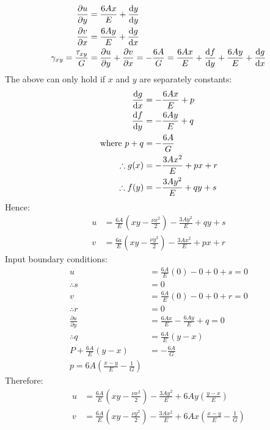 \documentclass[11pt]{article}
\numberwithin{equation}{section}
\begin{document}
\begin{align}
    \frac{\partial u }{\partial y}    & = \frac{6Ax}{E} + \frac{\dif y }{\dif y}                                                                                                                      \\
    \frac{\partial v}{\partial x}     & = \frac{6Ay}{E} + \frac{\dif g}{\dif x}                                                                                                                       \\
    \gamma_{xy} = \frac{\tau_{xy}}{G} & = \frac{\partial u}{\partial y} + \frac{\partial v}{\partial x} = -\frac{6A}{G}= \frac{6Ax}{E} + \frac{\dif f}{\dif y} + \frac{6Ay}{E}+ \frac{\dif g}{\dif x}
\end{align}
The above can only hold if $x$ and $y$ are separately constants:
\begin{align}
    \frac{\dif g}{\dif x} & = -\frac{6Ax}{E} + p        \\
    \frac{\dif f}{\dif y} & = -\frac{6Ay}{E} + q        \\
    \textrm{where } p+q   & = -\frac{6A}{G}             \\
    \therefore g(x)       & = -\frac{3Ax^2}{E} + px + r \\
    \therefore f(y)       & = -\frac{3Ay^2}{E} + qy + s
\end{align}
Hence:
\begin{align}
    u & = \frac{6A}{E}\left(xy - \frac{\nu x^2}{2}\right)-\frac{3Ay^2}{E} + qy +s  \\
    v & = \frac{6a}{E}\left(xy - \frac{\nu y^2}{2}\right)-\frac{3Ax^2}{E} + px + r
\end{align}
Input boundary conditions:
\begin{align}
    u                                  & = \frac{6A}{E} \left(0\right) - 0 + 0+ s= 0 \\
    \therefore s                       & = 0                                         \\
    v                                  & = \frac{6A}{E} \left(0\right) - 0 + 0+ r= 0 \\
    \therefore r                       & = 0                                         \\
    \frac{\partial u}{\partial y}      & = \frac{6Ax}{E} - \frac{6Ay}{E} + q = 0     \\
    \therefore q                       & = \frac{6A}{E}\left(y - x\right)            \\
    P + \frac{6A}{E}\left(y - x\right) & = - \frac{6A}{G}                            \\
    p = 6A\left(\frac{x-y}{E}-\frac{1}{G}\right)
\end{align}
Therefore:
\begin{align}
    u & = \frac{6A}{E}\left(xy-\frac{\nu x^2}{2}\right) - \frac{3Ay^2}{E} + 6Ay\left(\frac{y-x}{E}\right)             \\
    v & = \frac{6A}{E}\left(xy-\frac{\nu y^2}{2}\right) - \frac{3Ax^2}{E} + 6Ax\left(\frac{x-y}{E}-\frac{1}{G}\right)
\end{align}
\end{document}
